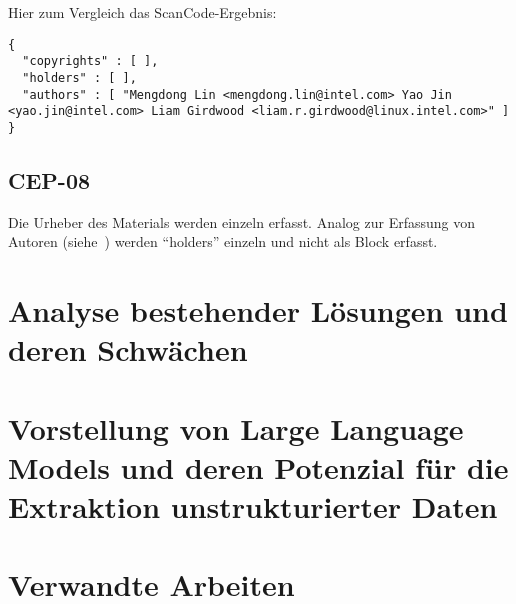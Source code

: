 Hier zum Vergleich das ScanCode-Ergebnis:

\begin{lstlisting}[numbers=none, keepspaces=true]
{
  "copyrights" : [ ],
  "holders" : [ ],
  "authors" : [ "Mengdong Lin <mengdong.lin@intel.com> Yao Jin <yao.jin@intel.com> Liam Girdwood <liam.r.girdwood@linux.intel.com>" ]
}
\end{lstlisting}


\subsection{CEP-08}\label{subsec:cep-08}

Die Urheber des Materials werden einzeln erfasst.
Analog zur Erfassung von Autoren (siehe~) werden \enquote{holders} einzeln und nicht als Block erfasst.


\section{Analyse bestehender Lösungen und deren Schwächen}\label{sec:analyse-bestehender-losungen}


\section{Vorstellung von Large Language Models und deren Potenzial für die Extraktion unstrukturierter Daten}\label{sec:vorstellung-llm}


\section{Verwandte Arbeiten}\label{sec:verwandte-arbeiten}

